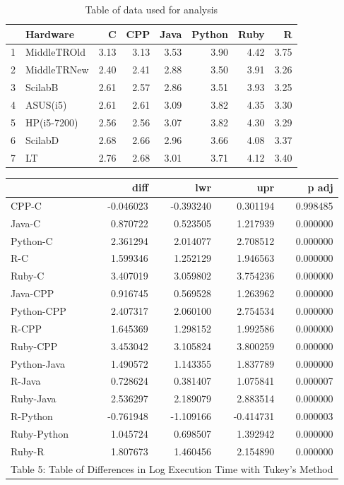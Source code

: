 \documentclass[12pt,halfline,a4paper,]{ouparticle}
\begin{document}
\begin{table}[ht]
\centering
\begin{tabular}{rlrrrrrr}
  \hline
 & Hardware & C & CPP & Java & Python & Ruby & R \\ 
  \hline
1 & MiddleTROld & 3.13 & 3.13 & 3.53 & 3.90 & 4.42 & 3.75 \\ 
  2 & MiddleTRNew & 2.40 & 2.41 & 2.88 & 3.50 & 3.91 & 3.26 \\ 
  3 & ScilabB & 2.61 & 2.57 & 2.86 & 3.51 & 3.93 & 3.25 \\ 
  4 & ASUS(i5) & 2.61 & 2.61 & 3.09 & 3.82 & 4.35 & 3.30 \\ 
  5 & HP(i5-7200) & 2.56 & 2.56 & 3.07 & 3.82 & 4.30 & 3.29 \\ 
  6 & ScilabD & 2.68 & 2.66 & 2.96 & 3.66 & 4.08 & 3.37 \\ 
  7 & LT & 2.76 & 2.68 & 3.01 & 3.71 & 4.12 & 3.40 \\ 
   \hline
\end{tabular}
\caption{Table of data used for analysis} 
\end{table}
\begingroup\fontsize{9}{11}\selectfont

\begin{longtable}[t]{lrrrr}
\toprule
 & diff & lwr & upr & p adj\\
\midrule
CPP-C & -0.046023 & -0.393240 & 0.301194 & 0.998485\\
Java-C & 0.870722 & 0.523505 & 1.217939 & 0.000000\\
Python-C & 2.361294 & 2.014077 & 2.708512 & 0.000000\\
R-C & 1.599346 & 1.252129 & 1.946563 & 0.000000\\
Ruby-C & 3.407019 & 3.059802 & 3.754236 & 0.000000\\
\addlinespace
Java-CPP & 0.916745 & 0.569528 & 1.263962 & 0.000000\\
Python-CPP & 2.407317 & 2.060100 & 2.754534 & 0.000000\\
R-CPP & 1.645369 & 1.298152 & 1.992586 & 0.000000\\
Ruby-CPP & 3.453042 & 3.105824 & 3.800259 & 0.000000\\
Python-Java & 1.490572 & 1.143355 & 1.837789 & 0.000000\\
\addlinespace
R-Java & 0.728624 & 0.381407 & 1.075841 & 0.000007\\
Ruby-Java & 2.536297 & 2.189079 & 2.883514 & 0.000000\\
R-Python & -0.761948 & -1.109166 & -0.414731 & 0.000003\\
Ruby-Python & 1.045724 & 0.698507 & 1.392942 & 0.000000\\
Ruby-R & 1.807673 & 1.460456 & 2.154890 & 0.000000\\
\bottomrule
\multicolumn{5}{l}{\rule{0pt}{1em}Table 5: Table of Differences in Log Execution Time with Tukey's Method}\\
\end{longtable}
\endgroup{}
\end{document}
